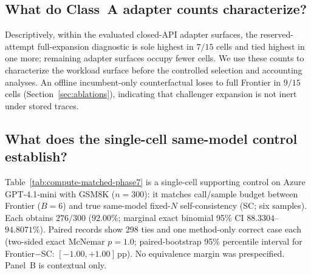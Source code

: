\subsection{What do Class~A adapter counts characterize?}

Descriptively, within the evaluated closed-API adapter surfaces, the reserved-attempt full-expansion
diagnostic is sole highest in $7/15$ cells and tied highest in one more; remaining adapter surfaces
occupy fewer cells. We use these counts to characterize the workload surface before the controlled
selection and accounting analyses. An offline incumbent-only counterfactual loses to full Frontier
in $9/15$ cells (Section~\ref{sec:ablations}), indicating that challenger expansion is not inert
under stored traces.

\subsection{What does the single-cell same-model control establish?}
\label{sec:sc-entitlement-control}

Table~\ref{tab:compute-matched-phase7} is a single-cell supporting control on Azure GPT-4.1-mini
with GSM8K ($n{=}300$): it matches call/sample budget between Frontier
($B{=}6$) and true same-model fixed-$N$ self-consistency (SC; six samples). Each obtains $276/300$
($92.00\%$; marginal exact binomial 95\% CI $88.3304$--$94.8071\%$). Paired records show 298 ties
and one method-only correct case each (two-sided exact McNemar $p{=}1.0$; paired-bootstrap 95\%
percentile interval for Frontier$-$SC: $[-1.00,+1.00]$\,pp). No equivalence margin was prespecified.
Panel~B is contextual only.

\begin{table}[tbp]
\centering
\footnotesize
\caption{Single-cell supporting control on Azure \texttt{gpt-4.1-mini}$\times$GSM8K ($n{=}300$).
Panel~A matches call/sample budget (Frontier $B{=}6$ vs.\ SC with six samples); rows are not
token-, latency-, dollar-, or FLOP-matched. Panel~B is contextual adapter/FTA context on the same
IDs.}
\label{tab:compute-matched-phase7}

\end{table}
